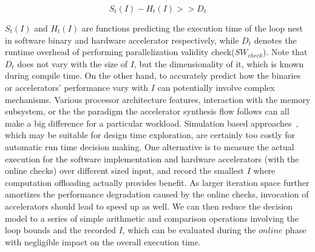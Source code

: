 \begin{equation}
\label{checkWorth}
  S_t(I)-H_t(I) >>  D_t
\end{equation}


$S_t(I)$ and $H_t(I)$ are %
functions predicting the execution time of the loop nest in software binary and hardware accelerator respectively, while $D_t$ denotes the 
runtime overhead of performing parallelization validity check($SW_{check}$). %
Note that $D_t$ does not vary with the size of $I$, but the dimensionality of it, which is known during compile time.
On the other hand, to accurately predict how the binaries or accelerators' performance vary with $I$ can potentially involve complex mechanisms.
Various processor architecture features, interaction with the memory subsystem, or the the paradigm the accelerator synthesis flow follows can all make a big difference for a particular workload. Simulation based approaches~\cite{Oyamada:2007:SPE:1323351.1323449}\cite{Meswani:2013:MPP:2493921.2493922}, which may be suitable for design time exploration, are certainly too costly for automatic run time decision making. 
One alternative is to measure the actual execution for the software implementation and hardware accelerators (with the online checks) over different sized input, and record the smallest $I$ where computation offloading actually provides benefit. As larger iteration space further amortizes the performance degradation caused by the online checks, invocation of accelerators should lead to speed up as well.
We can then reduce the decision model to a series of simple arithmetic and comparison operations involving the loop bounds and the recorded $I$, which can be evaluated during the $online$ phase with negligible impact on the overall execution time.

